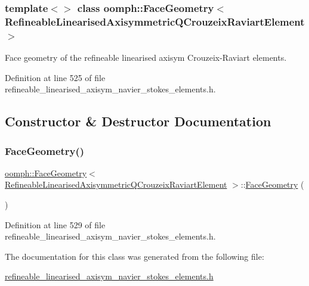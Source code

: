 \subsubsection*{template$<$$>$\newline
class oomph\+::\+Face\+Geometry$<$ Refineable\+Linearised\+Axisymmetric\+Q\+Crouzeix\+Raviart\+Element $>$}

Face geometry of the refineable linearised axisym Crouzeix-\/\+Raviart elements. 

Definition at line 525 of file refineable\+\_\+linearised\+\_\+axisym\+\_\+navier\+\_\+stokes\+\_\+elements.\+h.



\subsection{Constructor \& Destructor Documentation}
\mbox{\label{classoomph_1_1FaceGeometry_3_01RefineableLinearisedAxisymmetricQCrouzeixRaviartElement_01_4_a9caa77c563f6fe8d7db893cf14abc182}} 
\subsubsection{\texorpdfstring{Face\+Geometry()}{FaceGeometry()}}
{\footnotesize\ttfamily \hyperlink{classoomph_1_1FaceGeometry}{oomph\+::\+Face\+Geometry}$<$ \hyperlink{classoomph_1_1RefineableLinearisedAxisymmetricQCrouzeixRaviartElement}{Refineable\+Linearised\+Axisymmetric\+Q\+Crouzeix\+Raviart\+Element} $>$\+::\hyperlink{classoomph_1_1FaceGeometry}{Face\+Geometry} (\begin{DoxyParamCaption}{ }\end{DoxyParamCaption})\hspace{0.3cm}{\ttfamily [inline]}}



Definition at line 529 of file refineable\+\_\+linearised\+\_\+axisym\+\_\+navier\+\_\+stokes\+\_\+elements.\+h.



The documentation for this class was generated from the following file\+:\begin{DoxyCompactItemize}
\item 
\hyperlink{refineable__linearised__axisym__navier__stokes__elements_8h}{refineable\+\_\+linearised\+\_\+axisym\+\_\+navier\+\_\+stokes\+\_\+elements.\+h}\end{DoxyCompactItemize}
